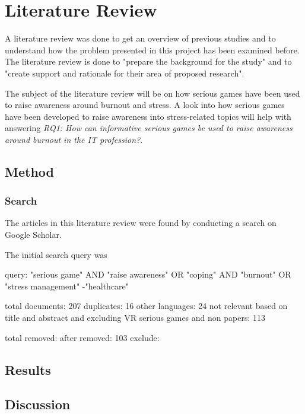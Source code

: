 \chapter{Literature Review}

A literature review was done to get an overview of previous studies and to understand how the problem presented in this project has been examined before. 
The literature review is done to "prepare the background for the study" and to "create support and rationale for their area of proposed research". 


The subject of the literature review will be on how serious games have been used to raise awareness around burnout and stress. A look into how serious games have been developed to raise awareness into stress-related topics will help with answering \textit{RQ1: How can informative serious games be used to raise awareness around burnout in the IT profession?}.

\section{Method}

\subsection{Search}
The articles in this literature review were found by conducting a search on Google Scholar.

The initial search query was


query: "serious game" AND "raise awareness" OR "coping" AND "burnout" OR "stress management" -"healthcare"

total documents: 207
duplicates: 16
other languages: 24
not relevant based on title and abstract and excluding VR serious games and non papers: 113

total removed: 
after removed: 103
exclude: 
\section{Results}
\section{Discussion}
